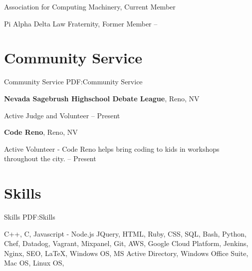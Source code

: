 \documentclass[a4paper,10pt,oneside]{article}
\begin{document}
\begin{body}
\EntryGap
Association for Computing Machinery,
\newline Current Member

\EntryGap
Pi Alpha Delta Law Fraternity,
\newline Former Member
\hfill
{} --


\section
{Community Service}
{Community Service}
{PDF:Community Service}

{\textbf{Nevada Sagebrush Highschool Debate League}},
Reno, NV
\par
Active Judge and Volunteer
\hfill
{} --
Present\newline

{\textbf{Code Reno}},
Reno, NV
\par
Active Volunteer - Code Reno helps bring coding to kids in \newline workshops throughout the city.
\hfill
{} --
Present


\section
{Skills}
{Skills}
{PDF:Skills}

C++,
C,
Javascript - Node.js JQuery,
HTML, Ruby, CSS, SQL,
Bash, Python, Chef, Datadog, \newline
Vagrant,
Mixpanel,
Git,
AWS,
Google Cloud Platform,
Jenkins,
Nginx,
SEO,
{\LaTeX}, 
 \newline Windows OS, MS Active Directory, Windows Office Suite,
Mac OS, Linux OS,



\end{body}

\end{document}
